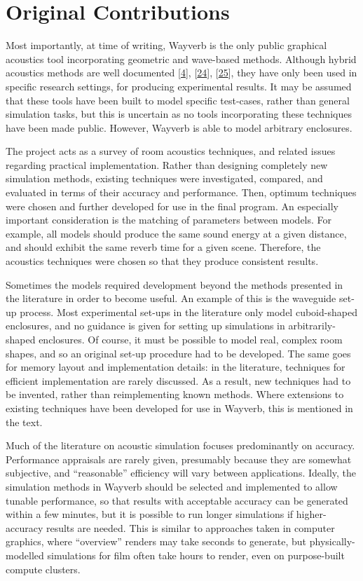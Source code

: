 \documentclass[]{scrreprt}
\begin{document}
\section{Original Contributions}\label{original-contributions}

Most importantly, at time of writing, Wayverb is the only public
graphical acoustics tool incorporating geometric and wave-based methods.
Although hybrid acoustics methods are well documented
{[}\protect\hyperlink{ref-aretzux5fcombinedux5f2009}{4}{]},
{[}\protect\hyperlink{ref-southernux5fhybridux5f2013}{24}{]},
{[}\protect\hyperlink{ref-murphyux5fhybridux5f2008}{25}{]}, they have
only been used in specific research settings, for producing experimental
results. It may be assumed that these tools have been built to model
specific test-cases, rather than general simulation tasks, but this is
uncertain as no tools incorporating these techniques have been made
public. However, Wayverb is able to model arbitrary enclosures.

The project acts as a survey of room acoustics techniques, and related
issues regarding practical implementation. Rather than designing
completely new simulation methods, existing techniques were
investigated, compared, and evaluated in terms of their accuracy and
performance. Then, optimum techniques were chosen and further developed
for use in the final program. An especially important consideration is
the matching of parameters between models. For example, all models
should produce the same sound energy at a given distance, and should
exhibit the same reverb time for a given scene. Therefore, the acoustics
techniques were chosen so that they produce consistent results.

Sometimes the models required development beyond the methods presented
in the literature in order to become useful. An example of this is the
waveguide set-up process. Most experimental set-ups in the literature
only model cuboid-shaped enclosures, and no guidance is given for
setting up simulations in arbitrarily-shaped enclosures. Of course, it
must be possible to model real, complex room shapes, and so an original
set-up procedure had to be developed. The same goes for memory layout
and implementation details: in the literature, techniques for efficient
implementation are rarely discussed. As a result, new techniques had to
be invented, rather than reimplementing known methods. Where extensions
to existing techniques have been developed for use in Wayverb, this is
mentioned in the text.

Much of the literature on acoustic simulation focuses predominantly on
accuracy. Performance appraisals are rarely given, presumably because
they are somewhat subjective, and ``reasonable'' efficiency will vary
between applications. Ideally, the simulation methods in Wayverb should
be selected and implemented to allow tunable performance, so that
results with acceptable accuracy can be generated within a few minutes,
but it is possible to run longer simulations if higher-accuracy results
are needed. This is similar to approaches taken in computer graphics,
where ``overview'' renders may take seconds to generate, but
physically-modelled simulations for film often take hours to render,
even on purpose-built compute clusters.
\end{document}
